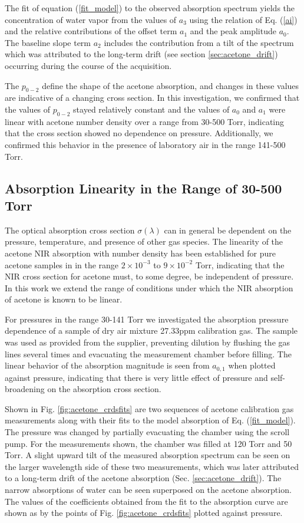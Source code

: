 \documentclass[8pt,a4paper]{report}
\begin{document}
	The fit of equation (\ref{fit_model}) to the observed absorption spectrum yields the concentration of water vapor from the values of $a_{3}$ using the relation of Eq. (\ref{ai}) and the relative contributions of the offset term $a_1$ and the peak amplitude $a_0$. The baseline slope term $a_2$ includes the contribution from a tilt of the spectrum which was attributed to the long-term drift (see section \ref{sec:acetone_drift}) occurring during the course of the acquisition.
	
	The $p_{0-2}$ define the shape of the acetone absorption, and changes in these values are indicative of a changing cross section. In this investigation, we confirmed that the values of $p_{0-2}$ stayed relatively constant and the values of $a_0$ and $a_1$ were linear with acetone number density over a range from 30-500 Torr, indicating that the cross section showed no dependence on pressure. Additionally, we confirmed this behavior in the presence of laboratory air in the range 141-500 Torr.
	
	\subsection{Absorption Linearity in the Range of 30-500 Torr}
	The optical absorption cross section $\sigma(\lambda)$ can in general be dependent on the pressure, temperature, and presence of other gas species. The linearity of the acetone NIR absorption with number density has been established for pure acetone samples in \cite{Wang_2004} in the range $2\times10^{-3}$ to $9\times10^{-2}$ Torr, indicating that the NIR cross section for acetone must, to some degree, be independent of pressure. In this work we extend the range of conditions under which the NIR absorption of acetone is known to be linear.
	
	For pressures in the range 30-141 Torr we investigated the absorption pressure dependence of a sample of dry air mixture 27.33ppm calibration gas. The sample was used as provided from the supplier, preventing dilution by flushing the gas lines several times and evacuating the measurement chamber before filling. The linear behavior of the absorption magnitude is seen from $a_{0,1}$ when plotted against pressure, indicating that there is very little effect of pressure and self-broadening on the absorption cross section.
	
	Shown in Fig. \ref{fig:acetone_crdsfits} are two sequences of acetone calibration gas measurements along with their fits to the model absorption of Eq. (\ref{fit_model}). The pressure was changed by partially evacuating the chamber using the scroll pump. For the measurements shown, the chamber was filled at 120 Torr and 50 Torr. A slight upward tilt of the measured absorption spectrum can be seen on the larger wavelength side of these two measurements, which was later attributed to a long-term drift of the acetone absorption (Sec. \ref{sec:acetone_drift}). The narrow absorptions of water can be seen superposed on the acetone absorption. The values of the coefficients obtained from the fit to the absorption curve are shown as by the points of Fig. \ref{fig:acetone_crdsfits} plotted against pressure.
	
\end{document}
